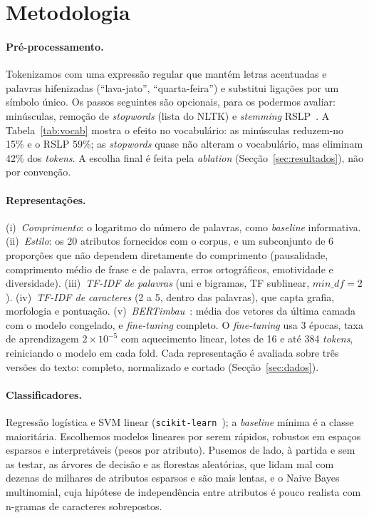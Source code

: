 \section{Metodologia}\label{sec:metodo}

\paragraph{Pré-processamento.}
Tokenizamos com uma expressão regular que mantém letras acentuadas e palavras hifenizadas
(``lava-jato'', ``quarta-feira'') e substitui ligações por um símbolo único. Os passos seguintes
são opcionais, para os podermos avaliar: minúsculas, remoção de \emph{stopwords} (lista do NLTK)
e \emph{stemming} RSLP~\cite{orengo2001}. A Tabela~\ref{tab:vocab} mostra o efeito no vocabulário:
as minúsculas reduzem-no 15\% e o RSLP 59\%; as \emph{stopwords} quase não alteram o vocabulário,
mas eliminam 42\% dos \emph{tokens}. A escolha final é feita pela \emph{ablation}
(Secção~\ref{sec:resultados}), não por convenção.



\paragraph{Representações.}
(i)~\emph{Comprimento}: o logaritmo do número de palavras, como \emph{baseline} informativa.
(ii)~\emph{Estilo}: os 20 atributos fornecidos com o corpus, e um subconjunto de 6 proporções que
não dependem diretamente do comprimento (pausalidade, comprimento médio de frase e de palavra,
erros ortográficos, emotividade e diversidade). (iii)~\emph{TF-IDF de palavras} (uni e bigramas,
TF sublinear, $\mathit{min\_df}=2$). (iv)~\emph{TF-IDF de caracteres} (2 a 5, dentro das palavras),
que capta grafia, morfologia e pontuação. (v)~\emph{BERTimbau}~\cite{souza2020}: média dos vetores
da última camada com o modelo congelado, e \emph{fine-tuning} completo.
O \emph{fine-tuning} usa 3 épocas, taxa de aprendizagem $2\times10^{-5}$ com aquecimento linear,
lotes de 16 e até 384 \emph{tokens}, reiniciando o modelo em cada fold.
Cada representação é avaliada sobre três versões do texto: completo, normalizado e cortado
(Secção~\ref{sec:dados}).

\paragraph{Classificadores.}
Regressão logística e SVM linear (\texttt{scikit-learn}~\cite{pedregosa2011}); a \emph{baseline}
mínima é a classe maioritária. Escolhemos modelos lineares por serem rápidos, robustos em espaços
esparsos e interpretáveis (pesos por atributo). Pusemos de lado, à partida e sem as testar,
as árvores de decisão e as florestas aleatórias, que lidam mal com dezenas de milhares de atributos
esparsos e são mais lentas, e o Naive Bayes multinomial, cuja hipótese de independência entre
atributos é pouco realista com n-gramas de caracteres sobrepostos.

